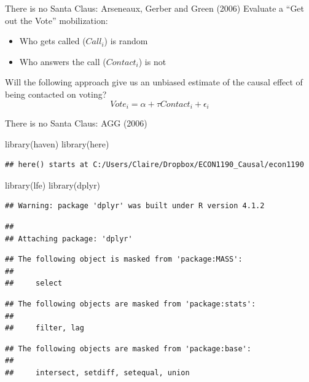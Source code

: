 \documentclass[
  ignorenonframetext,
]{beamer}
\newenvironment{Shaded}{\begin{snugshade}}{\end{snugshade}}
\newcommand{\FunctionTok}[1]{\textcolor[rgb]{0.00,0.00,0.00}{#1}}
\newcommand{\NormalTok}[1]{#1}
\begin{document}
\begin{frame}{There is no Santa Claus: Arseneaux, Gerber and Green
(2006)}
\protect\hypertarget{there-is-no-santa-claus-arseneaux-gerber-and-green-2006-1}{}
Evaluate a ``Get out the Vote'' mobilization:

\begin{itemize}
\item
  Who gets called (\(Call_i\)) is random
\item
  Who answers the call (\(Contact_i\)) is not
\end{itemize}

Will the following approach give us an unbiased estimate of the causal
effect of being contacted on voting? \[
Vote_i=\alpha+\tau Contact_i+\epsilon_i
\]
\end{frame}

\begin{frame}[fragile]{There is no Santa Claus: AGG (2006)}
\protect\hypertarget{there-is-no-santa-claus-agg-2006}{}
\tiny

\begin{Shaded}
\begin{Highlighting}[]
\FunctionTok{library}\NormalTok{(haven)}
\FunctionTok{library}\NormalTok{(here)}
\end{Highlighting}
\end{Shaded}

\begin{verbatim}
## here() starts at C:/Users/Claire/Dropbox/ECON1190_Causal/econ1190
\end{verbatim}

\begin{Shaded}
\begin{Highlighting}[]
\FunctionTok{library}\NormalTok{(lfe)}
\FunctionTok{library}\NormalTok{(dplyr)}
\end{Highlighting}
\end{Shaded}

\begin{verbatim}
## Warning: package 'dplyr' was built under R version 4.1.2
\end{verbatim}

\begin{verbatim}
## 
## Attaching package: 'dplyr'
\end{verbatim}

\begin{verbatim}
## The following object is masked from 'package:MASS':
## 
##     select
\end{verbatim}

\begin{verbatim}
## The following objects are masked from 'package:stats':
## 
##     filter, lag
\end{verbatim}

\begin{verbatim}
## The following objects are masked from 'package:base':
## 
##     intersect, setdiff, setequal, union
\end{verbatim}
\end{frame}
\end{document}
